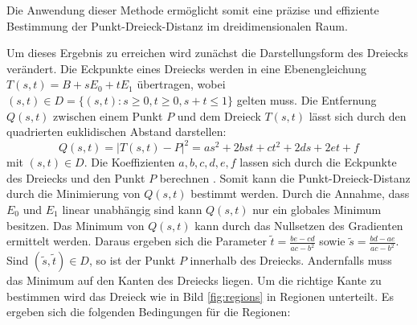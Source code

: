 \documentclass[conference]{IEEEtran}
\begin{document}
Die Anwendung dieser Methode ermöglicht somit eine präzise und effiziente Bestimmung der 
Punkt-Dreieck-Distanz im dreidimensionalen Raum.



Um dieses Ergebnis zu erreichen wird zunächst die Darstellungsform des Dreiecks verändert. Die Eckpunkte eines Dreiecks werden in eine Ebenengleichung $ T(s,t) = B + sE_0 + tE_1 $ übertragen, wobei $(s, t) \in D = \{(s,t): s \geq 0, t \geq 0, s + t \leq 1 \}$ gelten muss. Die Entfernung $Q(s,t)$ zwischen einem Punkt $P$ und dem Dreieck $T(s,t)$ lässt sich durch den quadrierten euklidischen Abstand darstellen: 
\begin{equation}
    Q(s,t) = |T(s,t) - P|^2 = as^2 + 2bst + ct^2 + 2ds + 2et + f
\end{equation}
mit $(s,t) \in D$. Die Koeffizienten $a, b, c, d, e, f$ lassen sich durch die Eckpunkte des Dreiecks und den Punkt $P$ berechnen \autocite*{eberlyDistancePointTriangle}. Somit kann die Punkt-Dreieck-Distanz durch die Minimierung von $Q(s,t)$ bestimmt werden. Durch die Annahme, dass $E_0$ und $E_1$ linear unabhängig sind kann $Q(s,t)$ nur ein globales Minimum besitzen. Das Minimum von $Q(s,t)$ kann durch das Nullsetzen des Gradienten ermittelt werden. Daraus ergeben sich die Parameter $\tilde{t} = \frac{be-cd}{ac-b^2}$ sowie $\tilde{s} = \frac{bd-ae}{ac-b^2}$. Sind $(\tilde{s}, \tilde{t}) \in D$, so ist der Punkt $P$ innerhalb des Dreiecks. Andernfalls muss das Minimum auf den Kanten des Dreiecks liegen. Um die richtige Kante zu bestimmen wird das Dreieck wie in Bild \ref{fig:regions} in Regionen unterteilt. Es ergeben sich die folgenden Bedingungen für die Regionen: 
\end{document}
